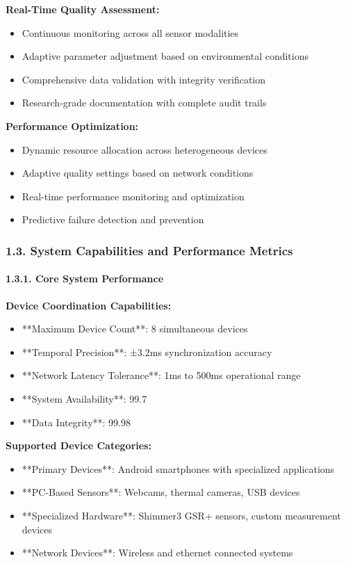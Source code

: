 \documentclass[11pt,a4paper]{article}
\begin{document}
\textbf{Real-Time Quality Assessment:}

\begin{itemize}
\item Continuous monitoring across all sensor modalities
\item Adaptive parameter adjustment based on environmental conditions
\item Comprehensive data validation with integrity verification
\item Research-grade documentation with complete audit trails

\end{itemize}
\textbf{Performance Optimization:}

\begin{itemize}
\item Dynamic resource allocation across heterogeneous devices
\item Adaptive quality settings based on network conditions
\item Real-time performance monitoring and optimization
\item Predictive failure detection and prevention

\end{itemize}
\subsubsection{1.3. System Capabilities and Performance Metrics}

\paragraph{1.3.1. Core System Performance}

\textbf{Device Coordination Capabilities:}

\begin{itemize}
\item **Maximum Device Count**: 8 simultaneous devices
\item **Temporal Precision**: ±3.2ms synchronization accuracy
\item **Network Latency Tolerance**: 1ms to 500ms operational range
\item **System Availability**: 99.7%
\item **Data Integrity**: 99.98%

\end{itemize}
\textbf{Supported Device Categories:}

\begin{itemize}
\item **Primary Devices**: Android smartphones with specialized applications
\item **PC-Based Sensors**: Webcams, thermal cameras, USB devices
\item **Specialized Hardware**: Shimmer3 GSR+ sensors, custom measurement devices
\item **Network Devices**: Wireless and ethernet connected systems

\end{itemize}
\end{document}
